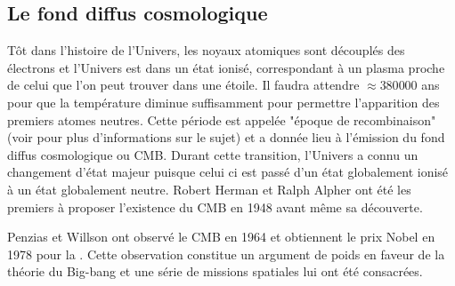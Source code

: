 \subsection{Le fond diffus cosmologique}
\label{sec:CMB}

Tôt dans l'histoire de l'Univers, les noyaux atomiques sont découplés des électrons et l'Univers est dans un état ionisé, correspondant à un plasma proche de celui que l'on peut trouver dans une étoile.
Il faudra attendre $\approx 380 000$ ans pour que la température diminue suffisamment pour permettre l'apparition des premiers atomes neutres.
Cette période est appelée "époque de recombinaison" (voir \cite{2009AN....330..657S} pour plus d'informations sur le sujet) et a donnée lieu à l'émission du fond diffus cosmologique ou \ac{CMB}.
Durant cette transition, l'Univers a connu un changement d'état majeur puisque celui ci est passé d'un état globalement ionisé à un état globalement neutre.
Robert Herman et Ralph Alpher ont été les premiers à proposer l’existence du \ac{CMB} en 1948 avant même sa découverte.
%
%

Penzias et Willson ont observé le \ac{CMB} en 1964 et obtiennent le prix Nobel en 1978 pour la \cite{PenziasWilsonNobel}.
Cette observation constitue un argument de poids en faveur de la théorie du Big-bang et une série de missions spatiales lui ont été consacrées.


